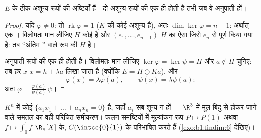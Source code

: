 \begin{theorem}\label{thm:b1:linmaps:hyperplanes}
$E$ के  ठीक अशून्य  रूपों की अष्टियाँ हैं। दो अशून्य रूपों की
 एक ही होती है तभी जब वे अनुपाती हों।
\end{theorem}

\begin{proof}
यदि $\varphi \neq 0$: तो $\operatorname{rk}\varphi = 1$ ($K$ की कोई अशून्य
  है), अतः $\dim\ker\varphi = n - 1$: अर्थात् एक ।
विलोमतः मान लीजिए $H$ कोई  है और $(e_1, \dots, e_{n-1})$ $H$ का ऐसा
 जिसे $e_n$ से पूर्ण किया गया है: तब ``अंतिम '' वाले रूप की
 $H$ है।

अनुपाती रूपों की  एक ही होती है। विलोमतः मान लीजिए $\ker\varphi =
\ker\psi = H$ और $a \notin H$ चुनिए: तब हर $x$ $x = h + \lambda a$ लिखा जाता
है (क्योंकि $E = H \oplus Ka$), और
\[
\varphi(x) = \lambda \varphi(a), \qquad \psi(x) = \lambda\psi(a):
\]
अतः $\varphi = \frac{\varphi(a)}{\psi(a)}\,\psi$।
\end{proof}

\begin{example}\label{ex:b1:linmaps:hyperplane}
$K^n$ में  कोई  $\{a_1 x_1 + \dots + a_n x_n = 0\}$ है,
जहाँ $a_i$ सब शून्य न हों --- $\R^3$ में मूल बिंदु से होकर जाने वाले समतल का
वही परिचित समीकरण। फलन समष्टियों में मूल्यांकन रूप $P \mapsto P(1)$ अथवा $f
\mapsto \int_0^1 f$ $\R_n[X]$ के, $C(\intcc{0}{1})$ के  परिभाषित करते
हैं (\cref{exo:b1:findim:6} देखिए)।
\end{example}

